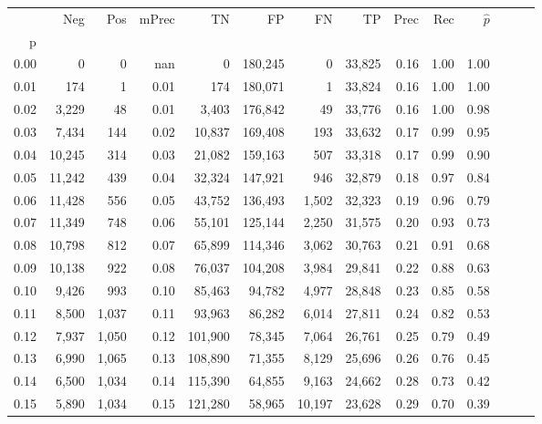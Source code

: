 \begin{tabular}{rrrrrrrrrrrrrr}
\toprule
{} &     Neg &    Pos & mPrec &       TN &       FP &      FN &      TP &  Prec &   Rec & $\hat{p}$ \\
p    &         &        &       &          &          &         &         &       &       &           \\
\midrule
0.00 &       0 &      0 &   nan &        0 &  180,245 &       0 &  33,825 &  0.16 &  1.00 &      1.00 \\
0.01 &     174 &      1 &  0.01 &      174 &  180,071 &       1 &  33,824 &  0.16 &  1.00 &      1.00 \\
0.02 &   3,229 &     48 &  0.01 &    3,403 &  176,842 &      49 &  33,776 &  0.16 &  1.00 &      0.98 \\
0.03 &   7,434 &    144 &  0.02 &   10,837 &  169,408 &     193 &  33,632 &  0.17 &  0.99 &      0.95 \\
0.04 &  10,245 &    314 &  0.03 &   21,082 &  159,163 &     507 &  33,318 &  0.17 &  0.99 &      0.90 \\
0.05 &  11,242 &    439 &  0.04 &   32,324 &  147,921 &     946 &  32,879 &  0.18 &  0.97 &      0.84 \\
0.06 &  11,428 &    556 &  0.05 &   43,752 &  136,493 &   1,502 &  32,323 &  0.19 &  0.96 &      0.79 \\
0.07 &  11,349 &    748 &  0.06 &   55,101 &  125,144 &   2,250 &  31,575 &  0.20 &  0.93 &      0.73 \\
0.08 &  10,798 &    812 &  0.07 &   65,899 &  114,346 &   3,062 &  30,763 &  0.21 &  0.91 &      0.68 \\
0.09 &  10,138 &    922 &  0.08 &   76,037 &  104,208 &   3,984 &  29,841 &  0.22 &  0.88 &      0.63 \\
0.10 &   9,426 &    993 &  0.10 &   85,463 &   94,782 &   4,977 &  28,848 &  0.23 &  0.85 &      0.58 \\
0.11 &   8,500 &  1,037 &  0.11 &   93,963 &   86,282 &   6,014 &  27,811 &  0.24 &  0.82 &      0.53 \\
0.12 &   7,937 &  1,050 &  0.12 &  101,900 &   78,345 &   7,064 &  26,761 &  0.25 &  0.79 &      0.49 \\
0.13 &   6,990 &  1,065 &  0.13 &  108,890 &   71,355 &   8,129 &  25,696 &  0.26 &  0.76 &      0.45 \\
0.14 &   6,500 &  1,034 &  0.14 &  115,390 &   64,855 &   9,163 &  24,662 &  0.28 &  0.73 &      0.42 \\
0.15 &   5,890 &  1,034 &  0.15 &  121,280 &   58,965 &  10,197 &  23,628 &  0.29 &  0.70 &      0.39 \\

\end{tabular}
